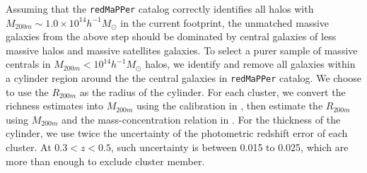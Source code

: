 \documentclass{emulateapj}
\def\redm{\texttt{redMaPPer}}
\newcommand{\alexie}[1]{\textcolor{blue}{\textbf{[Alexie: #1]}}}
\newcommand{\update}[1]{\textcolor{Bittersweet}{#1}}
\begin{document}
\begin{CJK*}{UTF8}{gbsn}
    Assuming that the \redm{} catalog correctly identifies all halos with 
    $M_{200m}\sim 1.0\times 10^{14} h^{-1} M_{\odot}$ in the current footprint,
    the unmatched massive galaxies from the above step should be dominated by central 
    galaxies of less massive halos and massive satellites galaxies.  
    \update{
    To select a purer sample of massive centrals in $M_{200m}<10^{14} h^{-1} M_{\odot}$
    halos, we identify and remove all galaxies within a cylinder region around the 
    the central galaxies in \redm{} catalog.
    We choose to use the $R_{200m}$ as the radius of the cylinder. 
    For each cluster, we convert the richness estimates into $M_{200m}$ using the 
    calibration in \citep{Simet2016}, then estimate the $R_{200m}$ using $M_{200m}$
    and the mass-concentration relation in \citep{Diemer2015}. 
    For the thickness of the cylinder, we use twice the uncertainty of the photometric 
    redshift error of each cluster.  
    At $0.3 < z < 0.5$, such uncertainty is between 0.015 to 0.025, which are more than 
    enough to exclude cluster member.}
    
    

\end{CJK*}
\end{document}
